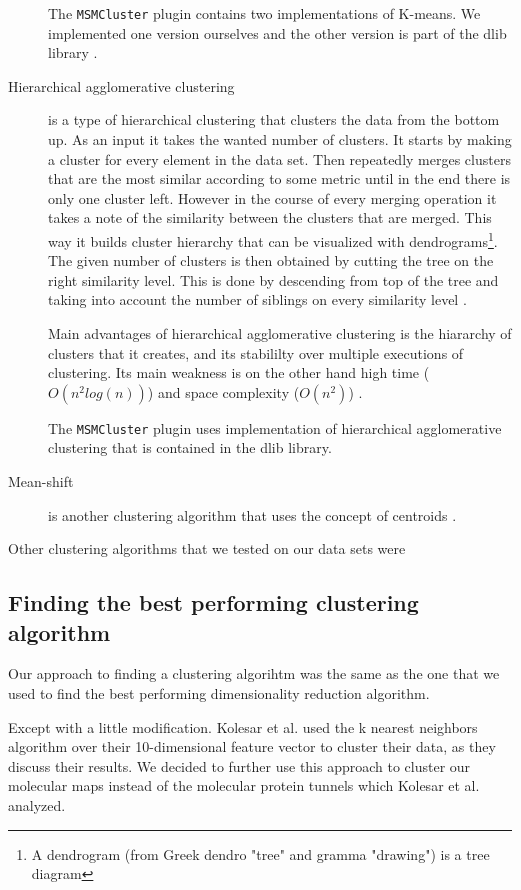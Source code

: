 \documentclass[journal]{vgtc}       %
\begin{document}
\begin{description}
The \verb|MSMCluster| plugin contains two implementations of K-means. We implemented one version ourselves and the other version is part of the dlib library \cite{dlib09}.
\item [Hierarchical agglomerative clustering] is a type of hierarchical clustering that clusters the data from the bottom up. As an input it takes the wanted number of clusters. It starts by making a cluster for every element in the data set. Then repeatedly merges clusters that are the most similar according to some metric until in the end there is only one cluster left. However in the course of every merging operation it takes a note of the similarity between the clusters that are merged. This way it builds cluster hierarchy that can be visualized with dendrograms\footnote{A dendrogram (from Greek dendro "tree" and gramma "drawing") is a tree diagram}. The given number of clusters is then obtained by cutting the tree on the right similarity level. This is done by descending from top of the tree and taking into account the number of siblings on every similarity level \cite{iir}.

Main advantages of hierarchical agglomerative clustering is the hiararchy of clusters that it creates, and its stabililty over multiple executions of clustering. Its main weakness is on the other hand high time ($O(n^2 log(n))$) and space complexity ($O(n^2)$) \cite{jain1999data}.

The \verb|MSMCluster| plugin uses implementation of hierarchical agglomerative clustering that is contained in the dlib library. 
\item [Mean-shift] is another clustering algorithm that uses the concept of centroids \cite{dlib09}. %
\end{description}

Other clustering algorithms that we tested on our data sets were 

\subsection{Finding the best performing clustering algorithm}
Our approach to finding a clustering algorihtm was the same as the one that we used  to find the best performing dimensionality reduction algorithm.

Except with a little modification. Kolesar et al. \cite{kolesar} used the k nearest neighbors algorithm over their 10-dimensional feature vector to cluster their data, as they discuss their results. We decided to further use this approach to cluster our molecular maps instead of the molecular protein tunnels which Kolesar et al. analyzed.
\end{document}
